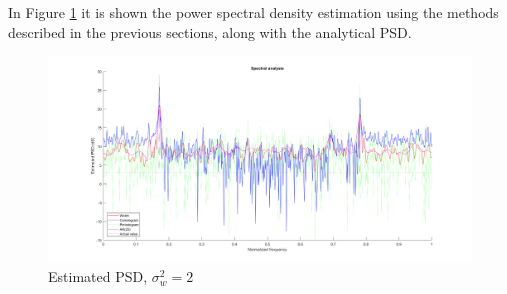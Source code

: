 \documentclass[a4paper, 12pt]{report}
\begin{document}
In Figure \ref{fig:estimatedpsd2} it is shown the power spectral density estimation using the methods described in the previous sections, along with the analytical PSD.

\begin{figure}[H]
	\centering
	\includegraphics[width=1\textwidth]{estimatedpsd2}
	\caption{Estimated PSD, $\sigma_w^2 = 2$}
	\label{fig:estimatedpsd2}
\end{figure}
\end{document}
